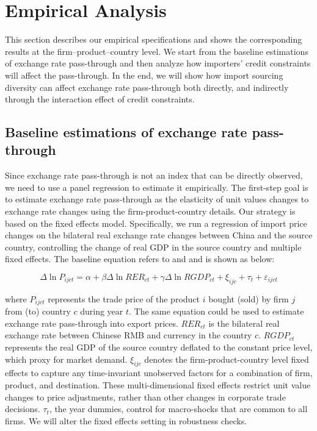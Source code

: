 \documentclass[12pt]{article}
\begin{document}
\section{Empirical Analysis} \label{Empirical}
This section describes our empirical specifications and shows the corresponding results at the firm–product–country level. We start from the baseline estimations of exchange rate pass-through and then analyze how importers' credit constraints will affect the pass-through. In the end, we will show how import sourcing diversity can affect exchange rate pass-through both directly, and indirectly through the interaction effect of credit constraints.

\subsection{Baseline estimations of exchange rate pass-through}

Since exchange rate pass-through is not an index that can be directly observed, we need to use a panel regression to estimate it empirically. The first-step goal is to estimate exchange rate pass-through as the elasticity of unit values changes to exchange rate changes using the firm-product-country details. Our strategy is based on the fixed effects model. Specifically, we run a regression of import price changes on the bilateral real exchange rate changes between China and the source country, controlling the change of real GDP in the source country and multiple fixed effects. The baseline equation refers to \cite{aik2014} and \cite{lmx2015} and is shown as below:

\begin{equation}
	\Delta \ln P_{i j c t}=\alpha+\beta \Delta \ln R E R_{c t}+\gamma \Delta \ln R G D P_{c t}+\xi_{i j c}+\tau_{t}+\varepsilon_{i j c t}
	\label{eq.baseline}
\end{equation}

where $P_{ijct}$ represents the trade price of the product $i$ bought (sold) by firm $j$ from (to) country $c$ during year $t$. The same equation could be used to estimate exchange rate pass-through into export prices. $R E R_{c t}$ is the bilateral real exchange rate between Chinese RMB and currency in the country $c$. $RGDP_{ct}$ represents the real GDP of the source country deflated to the constant price level, which proxy for market demand. $\xi_{ijc}$ denotes the firm-product-country level fixed effects to capture any time-invariant unobserved factors for a combination of firm, product, and destination. These multi-dimensional fixed effects restrict unit value changes to price adjustments, rather than other changes in corporate trade decisions. $\tau_t$, the year dummies, control for macro-shocks that are common to all firms. We will alter the fixed effects setting in robustness checks.
\end{document}
